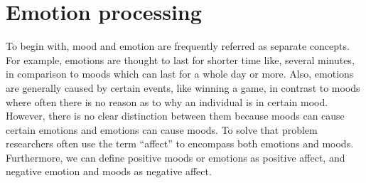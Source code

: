 \documentclass[a4paper]{report}
\begin{document}
 

	\section{Emotion processing}
		To begin with, mood and emotion are frequently referred as separate concepts. For example, emotions are thought to last for shorter time like, several minutes, in comparison to moods which can last for a whole day or more. Also, emotions are generally caused by certain events, like winning a game, in contrast to moods where often there is no reason as to why an individual is in certain mood. However, there is no clear distinction between them because moods can cause certain emotions and emotions can cause moods. To solve that problem researchers often use the term ``affect'' to encompass both emotions and moods. Furthermore, we can define positive moods or emotions as positive affect, and negative emotion and moods as negative affect.
		
\end{document}
